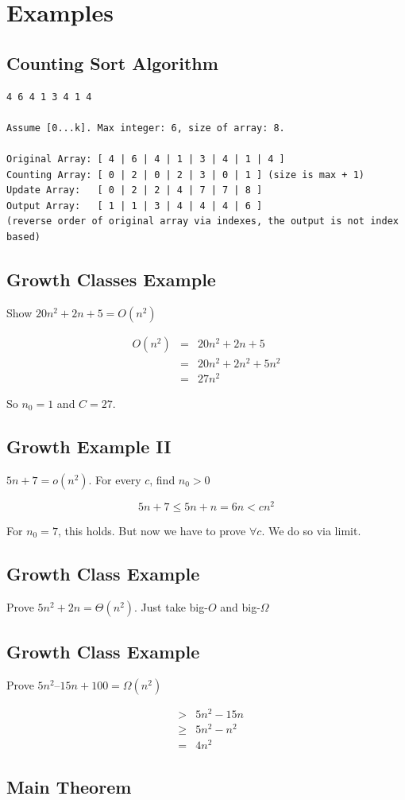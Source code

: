 \documentclass{article}
\begin{document}
\setcounter{section}{8}
\section{Examples}

\subsection{Counting Sort Algorithm}
\begin{verbatim}
4 6 4 1 3 4 1 4

Assume [0...k]. Max integer: 6, size of array: 8.

Original Array: [ 4 | 6 | 4 | 1 | 3 | 4 | 1 | 4 ]
Counting Array: [ 0 | 2 | 0 | 2 | 3 | 0 | 1 ] (size is max + 1)
Update Array:   [ 0 | 2 | 2 | 4 | 7 | 7 | 8 ]
Output Array:   [ 1 | 1 | 3 | 4 | 4 | 4 | 6 ]
(reverse order of original array via indexes, the output is not index based)

\end{verbatim}

\subsection{Growth Classes Example}
Show $20n^2 + 2n + 5  = O(n^2)$

\begin{eqnarray}
O(n^2) & = & 20n^2 + 2n + 5 \\
& = & 20n^2 + 2n^2 + 5n^2 \\
& = & 27n^2
\end{eqnarray}

So $n_0 = 1$ and $C = 27$.

\subsection{Growth Example II}
$5n+7 = o(n^2)$. For every $c$, find $n_0 > 0$

\begin{equation}
5n+7 \leq 5n + n = 6n < cn^2
\end{equation}

For $n_0 = 7$, this holds. But now we have to prove $\forall c$. We do so via limit.

\subsection{Growth Class Example}
Prove $5n^2 + 2n =  \Theta(n^2)$. Just take big-$O$ and big-$\Omega$

\subsection{Growth Class Example}
Prove $5n^2 – 15n + 100 = \Omega(n^2)$

\begin{eqnarray}
& > & 5n^2 - 15n \\
& \geq & 5n^2 - n^2 \\
& = & 4n^2
\end{eqnarray}

\subsection{Main Theorem}
\end{document}
